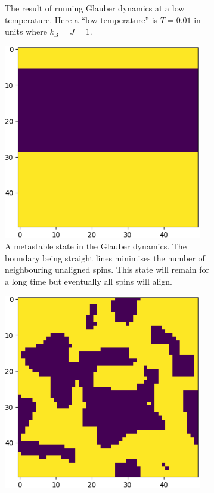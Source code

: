 \documentclass[fleqn]{NotesClass}
\newcommand*{\boltzmann}{k_{\mathrm{B}}}
\begin{document}
\begin{figure}
\begin{subfigure}[t]{0.45\textwidth}
            \caption[The result of running Glauber dynamics at a low temperature.]{The result of running Glauber dynamics at a low temperature. Here a \enquote{low temperature} is \(T = 0.01\) in units where \(\boltzmann = J = 1\).}
        \end{subfigure}
        \begin{subfigure}[t]{0.45\textwidth}
            \includegraphics[width=0.95\textwidth]{images/ising-glauber-metastable}
            \caption[Metastable state]{A metastable state in the Glauber dynamics. The boundary being straight lines minimises the number of neighbouring unaligned spins. This state will remain for a long time but eventually all spins will align.}
        \end{subfigure}
        \hspace{1em}
        \begin{subfigure}[t]{0.45\textwidth}
            \includegraphics[width=0.95\textwidth]{images/ising-glauber-low-temp-part-way}

\end{subfigure}
\end{figure}
\end{document}
